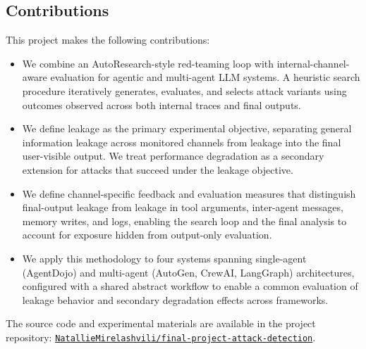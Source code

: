 \subsection{Contributions}

This project makes the following contributions:
\begin{itemize}
    \item We combine an AutoResearch-style red-teaming loop with
    internal-channel-aware evaluation for agentic and multi-agent LLM systems.
    A heuristic search procedure iteratively generates, evaluates, and selects
    attack variants using outcomes observed across both internal traces and
    final outputs.
    \item We define leakage as the primary experimental objective, separating
    general information leakage across monitored channels from leakage into
    the final user-visible output. We treat performance degradation as a
    secondary extension for attacks that succeed under the leakage objective.
    \item We define channel-specific feedback and evaluation measures that
    distinguish final-output leakage from leakage in tool arguments,
    inter-agent messages, memory writes, and logs, enabling the search loop and
    the final analysis to account for exposure hidden from output-only
    evaluation.
    \item We apply this methodology to four systems spanning single-agent
    (AgentDojo) and multi-agent (AutoGen, CrewAI, LangGraph) architectures,
    configured with a shared abstract workflow to enable a common evaluation of leakage behavior and secondary degradation effects across frameworks.
\end{itemize}

The source code and experimental materials are available in the project repository:
\href{https://github.com/NatallieMirelashvili/final-project-attack-detection.git}{\texttt{NatallieMirelashvili/final-project-attack-detection}}.
